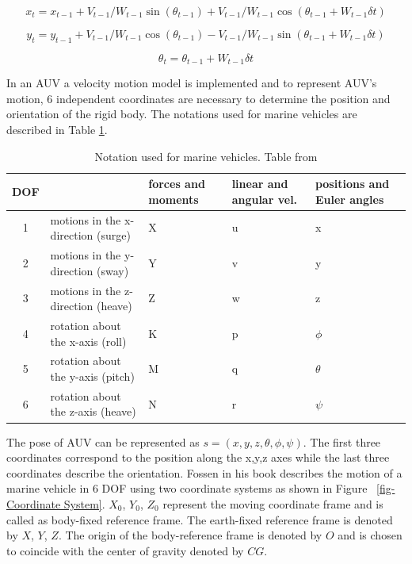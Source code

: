 \documentclass[12pt,draft]{dalcsthesis}
\begin{document}
\begin{equation}
 x_{t}=x_{t-1}+V_{t-1}/W_{t-1} \sin(\theta_{t-1})+ V_{t-1}/W_{t-1} \cos(\theta_{t-1} + W_{t-1} \delta t)
\end{equation}

\begin{equation}
\label{eq:velocity motion model_y}
y_{t}=y_{t-1}+V_{t-1}/W_{t-1} \cos(\theta_{t-1})- V_{t-1}/W_{t-1} \sin(\theta_{t-1} + W_{t-1} \delta t)
\end{equation}

\begin{equation}
\label{eq:velocity motion model_theta}
\theta_{t}=\theta_{t-1}+ W_{t-1} \delta t
\end{equation}
 


In an AUV a velocity motion model is implemented and to represent AUV's motion, 6 independent coordinates are necessary to determine the position and orientation of the rigid body. The notations used for marine vehicles are described in Table \ref{marine notation}. 

\begin{table}[tbh]
\centering
\label{marine notation}
\begin{tabular}{|c|>{\centering}p{3cm}|>{\centering}p{3cm}|>{\centering}p{3cm}|>{\centering}p{3cm}|}
\hline 
DOF &  & forces and moments & linear and angular vel. & positions and Euler angles\tabularnewline
\hline 
\hline 
1 & motions in the x-direction (surge) & X & u & x\tabularnewline
\hline 
2 & motions in the y-direction (sway) & Y & v & y\tabularnewline
\hline 
3 & motions in the z-direction (heave) & Z & w & z\tabularnewline
\hline 
4 & rotation about the x-axis (roll) & K & p & $\phi$\tabularnewline
\hline 
5 & rotation about the y-axis (pitch) & M & q & $\theta$\tabularnewline
\hline 
6 & rotation about the z-axis (heave) & N & r & $\psi$\tabularnewline
\hline 
\end{tabular}
\caption{Notation used for marine vehicles. Table from \cite{Thor}}
\end{table}




The pose of AUV can be represented as $s=(x,y,z,\theta,\phi,\psi)$. The first three coordinates correspond to the position along the x,y,z axes while the last three coordinates describe the orientation. Fossen \cite{Thor} in his book describes the motion of a marine vehicle in 6 DOF using two coordinate systems as shown in Figure ~\ref{fig-Coordinate System}. $X_0$, $Y_0$, $Z_0$ represent the moving coordinate frame and is called as body-fixed reference frame. The earth-fixed reference frame is denoted by $X$, $Y$, $Z$. The origin of the body-reference frame is denoted by $O$ and is chosen to coincide with the center of gravity denoted by $CG$.  
\end{document}
